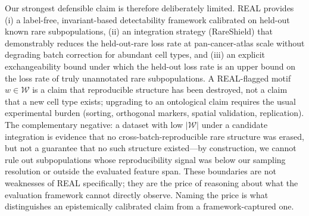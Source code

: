 Our strongest defensible claim is therefore deliberately limited. REAL provides (i) a label-free, invariant-based detectability framework calibrated on held-out known rare subpopulations, (ii) an integration strategy (RareShield) that demonstrably reduces the held-out-rare loss rate at pan-cancer-atlas scale without degrading batch correction for abundant cell types, and (iii) an explicit exchangeability bound under which the held-out loss rate is an upper bound on the loss rate of truly unannotated rare subpopulations. A REAL-flagged motif $w \in \mathcal{W}$ is a claim that reproducible structure has been destroyed, not a claim that a new cell type exists; upgrading to an ontological claim requires the usual experimental burden (sorting, orthogonal markers, spatial validation, replication). The complementary negative: a dataset with low $|\mathcal{W}|$ under a candidate integration is evidence that no cross-batch-reproducible rare structure was erased, but not a guarantee that no such structure existed---by construction, we cannot rule out subpopulations whose reproducibility signal was below our sampling resolution or outside the evaluated feature span. These boundaries are not weaknesses of REAL specifically; they are the price of reasoning about what the evaluation framework cannot directly observe. Naming the price is what distinguishes an epistemically calibrated claim from a framework-captured one.
